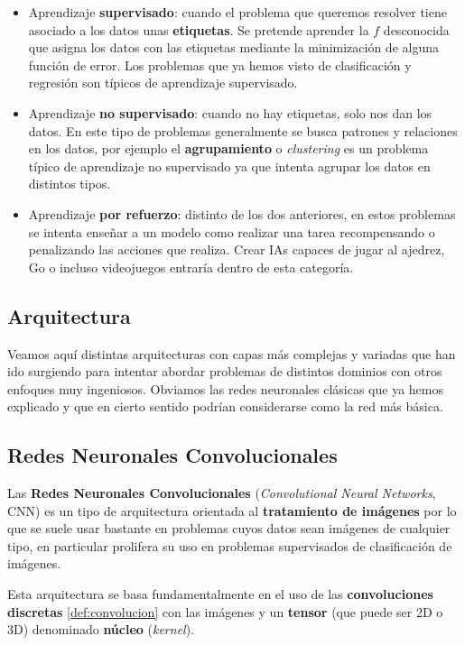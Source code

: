 \begin{itemize}
  \item Aprendizaje \textbf{supervisado}: cuando el problema que queremos resolver tiene asociado a los datos unas \textbf{etiquetas}. Se pretende aprender la $f$ desconocida que asigna los datos con las etiquetas mediante la minimización de alguna función de error. Los problemas que ya hemos visto de clasificación y regresión son típicos de aprendizaje supervisado.
  \item Aprendizaje \textbf{no supervisado}: cuando no hay etiquetas, solo nos dan los datos. En este tipo de problemas generalmente se busca patrones y relaciones en los datos, por ejemplo el \textbf{agrupamiento} o \emph{clustering} es un problema típico de aprendizaje no supervisado ya que intenta agrupar los datos en distintos tipos.
  \item Aprendizaje \textbf{por refuerzo}: distinto de los dos anteriores, en estos problemas se intenta enseñar a un modelo como realizar una tarea recompensando o penalizando las acciones que realiza. Crear IAs capaces de jugar al ajedrez, Go o incluso videojuegos entraría dentro de esta categoría.
\end{itemize}

\subsection{Arquitectura}

Veamos aquí distintas arquitecturas con capas más complejas y variadas que han ido surgiendo para intentar abordar problemas de distintos dominios con otros enfoques muy ingeniosos. Obviamos las redes neuronales clásicas que ya hemos explicado y que en cierto sentido podrían considerarse como la red más básica.

\subsection{Redes Neuronales Convolucionales}

Las \textbf{Redes Neuronales Convolucionales} (\emph{Convolutional Neural Networks}, CNN) \cite{lecun1995convolutional} es un tipo de arquitectura orientada al \textbf{tratamiento de imágenes} por lo que se suele usar bastante en problemas cuyos datos sean imágenes de cualquier tipo, en particular prolifera su uso en problemas supervisados de clasificación de imágenes.

Esta arquitectura se basa fundamentalmente en el uso de las \textbf{convoluciones discretas} \autoref{def:convolucion} con las imágenes y un \textbf{tensor} (que puede ser 2D o 3D) denominado \textbf{núcleo} (\emph{kernel}).

